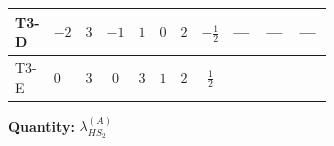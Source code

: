 \documentclass[8pt]{article}
\begin{document}
\begin{landscape}
\begin{longtable}{@{}llcccccc >{\raggedright\arraybackslash}p{0.21\linewidth} >{\raggedright\arraybackslash}p{0.21\linewidth} >{\raggedright\arraybackslash}p{0.21\linewidth}@{}}
\midrule
T3-D & $-2$ & $3$ & $-1$ & $1$ & $0$ & $2$ & $-\frac{1}{2}$ & --- & --- & --- \\
\midrule
T3-E & $0$ & $3$ & $0$ & $3$ & $1$ & $2$ & $\frac{1}{2}$ & \scriptsize\adjustbox{max width=\linewidth}{$\begin{gathered} +\frac{4}{3} \operatorname{Tr}\!\left({y_2}\,\left({y_2}\right)^{\dagger}\,{Y_e}\,\left({Y_e}\right)^{\dagger}\right)\end{gathered}$} & \scriptsize\adjustbox{max width=\linewidth}{$\begin{gathered} -\frac{8}{9} {\lambda_5} \left({\lambda_5}\right)^{*}\end{gathered}$} & \scriptsize\adjustbox{max width=\linewidth}{$\begin{gathered} +{g_1}^2 \left(4 {g_2}^2-\frac{15 {\lambda_{HS_2}^{(A)}}}{2}\right)\end{gathered}$} \\
\midrule
\bottomrule
\end{longtable}
\clearpage
\noindent\textbf{Quantity: }$\lambda_{HS_2}^{(A)}$\par\smallskip

\end{landscape}
\end{document}
